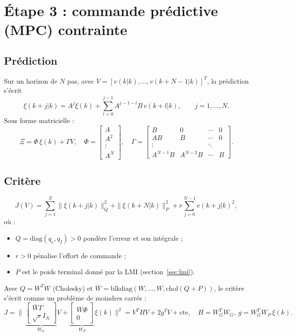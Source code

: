 \documentclass[11pt,a4paper]{article}
\begin{document}
\section{Étape 3 : commande prédictive (MPC) contrainte}

\subsection{Prédiction}
Sur un horizon de $N$ pas, avec $V=[v(k|k),\dots,v(k+N-1|k)]^T$, la prédiction s'écrit
\[
\xi(k+j|k)=A^j\xi(k)+\sum_{l=0}^{j-1}A^{j-1-l}B\,v(k+l|k),\qquad j=1,\dots,N .
\]
Sous forme matricielle :
\[
\Xi=\Phi\,\xi(k)+\Gamma V,\quad
\Phi=\begin{bmatrix}A\\A^2\\ \vdots\\ A^N\end{bmatrix},\quad
\Gamma=\begin{bmatrix}B&0&\cdots&0\\ AB&B&\cdots&0\\ \vdots&&\ddots&\\ A^{N-1}B&A^{N-2}B&\cdots&B\end{bmatrix}.
\]

\subsection{Critère}
\begin{equation}
J(V)=\sum_{j=1}^{N}\|\xi(k+j|k)\|_Q^2+\|\xi(k+N|k)\|_P^2+r\sum_{j=0}^{N-1}v(k+j|k)^2 ,
\label{eq:cout}
\end{equation}
où :
\begin{itemize}
\item $Q=\mathrm{diag}(q_e,q_I)>0$ pondère l'erreur et son intégrale ;
\item $r>0$ pénalise l'effort de commande ;
\item $P$ est le poids terminal donné par la LMI (section~\ref{sec:lmi}).
\end{itemize}
Avec $Q=W^TW$ (Cholesky) et $\bar W=\mathrm{blkdiag}(W,\dots,W,\mathrm{chol}(Q+P))$, le critère s'écrit comme un problème de moindres carrés :
\[
J=\big\|\,\underbrace{\begin{bmatrix}\bar W\Gamma\\ \sqrt r I_N\end{bmatrix}}_{W_G}V+\underbrace{\begin{bmatrix}\bar W\Phi\\0\end{bmatrix}}_{W_P}\xi(k)\big\|^2
= V^TH V+2g^TV+\text{cte},\quad H=W_G^TW_G,\ g=W_G^TW_P\,\xi(k).
\]
\end{document}

